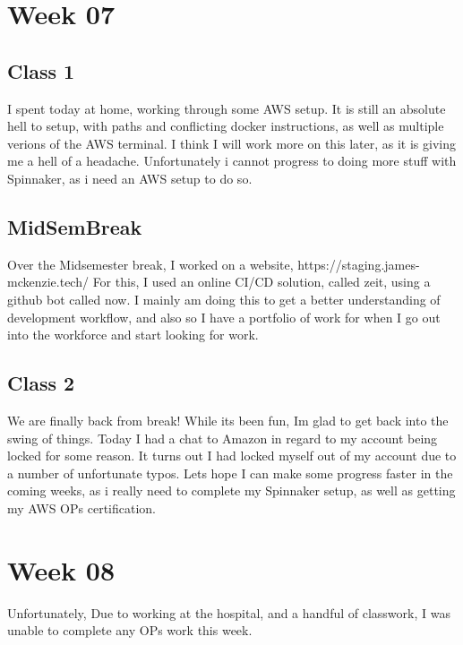 \documentclass{article}
\begin{document}
\section{Week 07}
\subsection{Class 1}
I spent today at home, working through some AWS setup. It is still an absolute hell to setup, with paths and conflicting docker instructions, 
as well as multiple verions of the AWS terminal. I think I will work more on this later, as it is giving me a hell of a headache. Unfortunately
i cannot progress to doing more stuff with Spinnaker, as i need an AWS setup to do so.
\subsection{MidSemBreak}
Over the Midsemester break, I worked on a website, https://staging.james-mckenzie.tech/ For this, I used an online CI/CD solution,
called zeit, using a github bot called now. I mainly am doing this to get a better understanding of development workflow, and also so I
have a portfolio of work for when I go out into the workforce and start looking for work.
\subsection{Class 2}
We are finally back from break! While its been fun, Im glad to get back into the swing of things. Today I had a chat to
Amazon in regard to my account being locked for some reason. It turns out I had locked myself out of my account due to a number
of unfortunate typos. Lets hope I can make some progress faster in the coming weeks, as i really need to complete my Spinnaker setup,
as well as getting my AWS OPs certification. 

\section{Week 08}
Unfortunately, Due to working at the hospital, and a handful of classwork, I was unable to complete any OPs work this week. 
\end{document}

